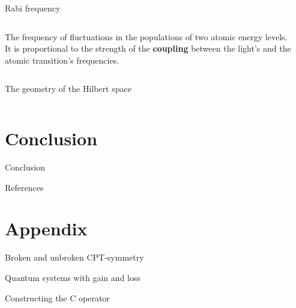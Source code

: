 \documentclass[10pt]{beamer}
\begin{document}
\begin{frame}{Rabi frequency}
\begin{columns}
    \hspace{1.5em}
    \begin{column}{\textwidth}
    The frequency of fluctuations in the populations of two atomic energy levels.\\
    \vspace{0.5cm}
    It is proportional to the strength of the \textbf{coupling} between the light's and the atomic transition's frequencies. 
    \end{column}
\end{columns}
\end{frame}

\begin{frame}{The geometry of the Hilbert space}
\begin{columns}
    \hspace{1.5em}
    \begin{column}{\textwidth}
    \end{column}
\end{columns}
\end{frame}

\section{Conclusion}
\begin{frame}{Conclusion}
\end{frame}

\begin{frame}{References} 
    \nocite{*}
    
    
\end{frame}

\section{Appendix}
\begin{frame}{Broken and unbroken CPT-symmetry}
\end{frame}

\begin{frame}{Quantum systems with gain and loss}
\end{frame}

\begin{frame}{Constructing the C operator}
\end{frame}
\end{document}
